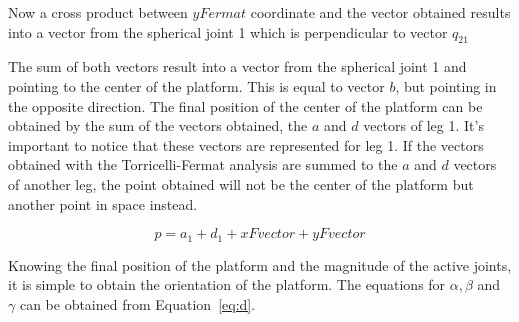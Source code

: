 \documentclass[titlepage, letterpaper, fleqn]{article}
\begin{document}




Now a cross product between $yFermat$ coordinate and the vector obtained results into a vector from the spherical joint 1 which is perpendicular to vector $q_{21}$


The sum of both vectors result into a vector from the spherical joint 1 and pointing to the center of the platform.
This is equal to vector $b$, but pointing in the opposite direction.
The final position of the center of the platform can be obtained by the sum of the vectors obtained, the $a$ and $d$ vectors of leg 1.
It's important to notice that these vectors are represented for leg 1.
If the vectors obtained with the Torricelli-Fermat analysis are summed
to the $a$ and $d$ vectors of another leg, the point obtained will not be the center of the platform but another point in space instead.

\begin{equation}
    \label{eq:p_Fermat}
    p = a_1 + d_1 + xFvector + yFvector
\end{equation}

Knowing the final position of the platform and the magnitude of the active joints, it is simple to obtain the orientation of the platform.
The equations for $\alpha, \beta$ and $\gamma$ can be obtained from Equation~\ref{eq:d}.






\end{document}
